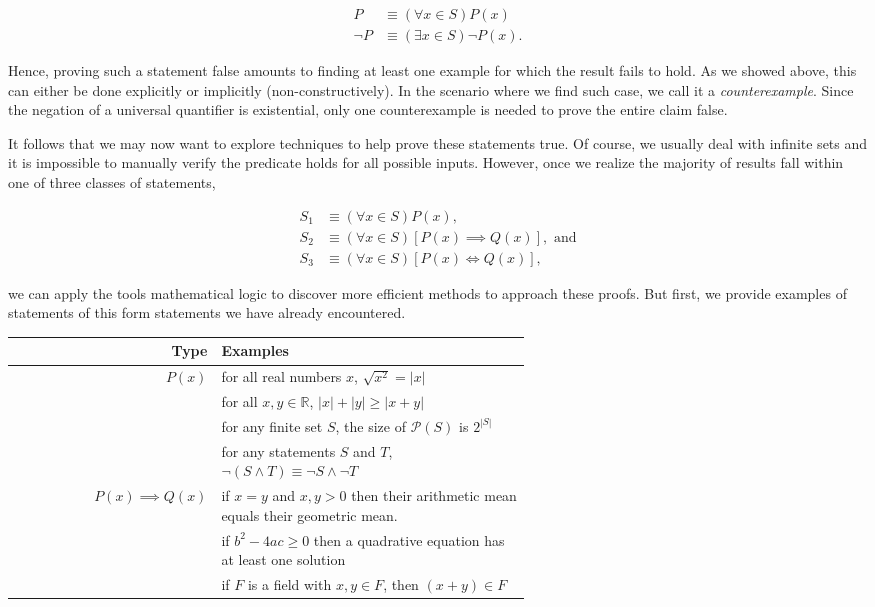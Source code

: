 \documentclass{report}
\begin{document}
\begin{align*}
	P &\equiv (\forall x \in S)P(x) \\
	\neg P &\equiv (\exists x \in S)\neg P(x).
\end{align*}

Hence, proving such a statement false amounts to finding at least one example for which the result fails to hold. As we showed above, this can either be done explicitly or implicitly (non-constructively). In the scenario where we find such case, we call it a \emph{counterexample}.  Since the negation of a universal quantifier is existential, only one counterexample is needed to prove the entire claim false.


It follows that we may now want to explore techniques to help prove these statements true. Of course, we usually deal with infinite sets and it is impossible to manually verify the predicate holds for all possible inputs. However, once we realize the majority of results fall within one of three classes of statements, 

\begin{align*}
	S_1 &\equiv (\forall x \in S)P(x), \\
	S_2 &\equiv (\forall x \in S)[P(x) \implies Q(x)], \text{ and} \\
	S_3 &\equiv (\forall x \in S)[P(x) \iff Q(x)],
\end{align*} 

we can apply the tools mathematical logic to discover more efficient methods to approach these proofs. But first, we provide examples of statements  of this form statements we have already encountered.

\vspace{\baselineskip}
\begin{center}
	\begin{tabular}{rp{0.6\linewidth}}
		\toprule
		Type & Examples \\
		\midrule
		$P(x)$ & for all real numbers $x$, $\sqrt{x^2} = |x|$ \\
		& for all $x, y \in \mathbb{R}$, $|x| + |y| \ge |x +y|$ \\
		& for any finite set $S$, the size of $\mathcal{P}(S)$ is $2^{|S|}$ \\
		& for any statements $S$ and $T$, $\neg(S \wedge T) \equiv \neg S \wedge \neg T $ \vspace{0.25\baselineskip} \\
		$P(x) \implies Q(x)$ & if $x = y$ and $x, y > 0$ then their arithmetic mean equals their geometric mean. \\
		& if $b^2 - 4ac \ge 0$ then a quadrative equation has at least one solution \\
		& if $F$ is a field with $x, y \in F$, then $(x + y) \in F$ \\
		\bottomrule
	\end{tabular}
\end{center}
\vspace{\baselineskip}
\end{document}
